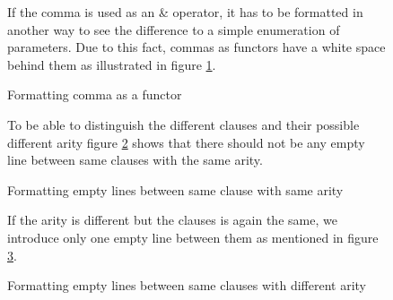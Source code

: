 \documentclass{article}
\begin{document}
\begin{figure}[h]
If the comma is used as an \& operator, it has to be formatted in another way to see the difference to a simple enumeration of parameters. Due to this fact, commas as functors have a white space behind them as illustrated in figure \ref{lst:comma}.\\

\begin{minipage}{.5\textwidth}

\end{minipage}
\hfill
\begin{minipage}{.5\textwidth}

\end{minipage}

\caption{Formatting comma as a functor}
\label{lst:comma}
\end{figure}


\begin{figure}[h]
To be able to distinguish the different clauses and their possible different arity figure \ref{lst:sameclause_arity} shows that there should not be any empty line between same clauses with the same arity.\\

\begin{minipage}{.5\textwidth}

\end{minipage}
\hfill
\begin{minipage}{.5\textwidth}

\end{minipage}

\caption{Formatting empty lines between same clause with same arity}
\label{lst:sameclause_arity}
\end{figure}

\begin{figure}[h]If the arity is different but the clauses is again the same, we introduce only one empty line between them as mentioned in figure \ref{lst:sameclauses}.\\

\begin{minipage}{.5\textwidth}

\end{minipage}
\hfill
\begin{minipage}{.5\textwidth}

\end{minipage}

\caption{Formatting empty lines between same clauses with different arity}
\label{lst:sameclauses}
\end{figure}
\end{document}
